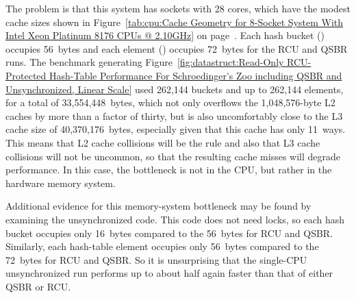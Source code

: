 The problem is that this system has sockets with 28 cores, which have
the modest cache sizes shown in
Figure~\ref{tab:cpu:Cache Geometry for 8-Socket System With Intel Xeon Platinum 8176 CPUs @ 2.10GHz}
on page~\pageref{tab:cpu:Cache Geometry for 8-Socket System With Intel Xeon Platinum 8176 CPUs @ 2.10GHz}.
Each hash bucket () occupies 56~bytes and each
element () occupies 72~bytes for the RCU and QSBR runs.
The benchmark generating
Figure~\ref{fig:datastruct:Read-Only RCU-Protected Hash-Table Performance For Schroedinger's Zoo including QSBR and Unsynchronized, Linear Scale}
used 262,144 buckets and up to 262,144 elements, for a total of
33,554,448~bytes, which not only overflows the 1,048,576-byte L2 caches
by more than a factor of thirty, but is also uncomfortably close to the
L3 cache size of 40,370,176~bytes, especially given that this cache has
only 11~ways.
This means that L2 cache collisions will be the rule and also that L3
cache collisions will not be uncommon, so that the resulting cache misses
will degrade performance.
In this case, the bottleneck is not in the CPU, but rather in the hardware
memory system.

Additional evidence for this memory-system bottleneck may be found by
examining the unsynchronized code.
This code does not need locks, so each hash bucket occupies only 16~bytes
compared to the 56~bytes for RCU and QSBR\@.
Similarly, each hash-table element occupies only 56~bytes compared to the
72~bytes for RCU and QSBR\@.
So it is unsurprising that the single-CPU unsynchronized run performs up
to about half again faster than that of either QSBR or RCU\@.

